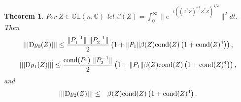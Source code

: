 \documentclass[12pt,epsfig,reqno]{amsart}
\newcommand{\C}{\mathbb{C}}
\newcommand{\De}{{\rm D}}
\newtheorem{thm}{Theorem}
\theoremstyle{remark}
\begin{document}
\begin{thm}\label{3.1}
For $Z\in \mathbb{GL}(n,\C)$ let $\beta(Z)=\int_0^\infty \|e^{-t\left( (Z^* Z)^{-1} \overline{Z^* Z}\right)^{1/2}}\|^2 dt$. Then
\begin{equation}
|||{\De\varrho_0(Z)}|||\leq  \frac{\|P_1^{-1}\| \ \|P_2^{-1}\|}{2 } \left( 1+ \|P_1\|  \beta(Z)
\text{\rm cond} (Z)  \left(1+\text{\rm cond}(Z)^4\right)\right),\label{bound for W}
\end{equation}
\begin{equation}
|||{\De\varrho_1(Z)}|||\leq \frac{\text{\rm cond} (P_1) \ \|P_2^{-1}\| }{2 } \left(1+\|P_1\| \beta(Z)
\text{\rm cond} (Z)  \left(1+\text{\rm cond}(Z)^4\right)\right),\label{bound for P_1}
\end{equation}
and
\begin{eqnarray}
|||{\De \varrho_2(Z)}|||&\leq&  \beta(Z)
\text{\rm cond} (Z) \left(1+\text{\rm cond}(Z)^4\right). \label{bound for P_2}
\end{eqnarray}
\end{thm}
\end{document}
